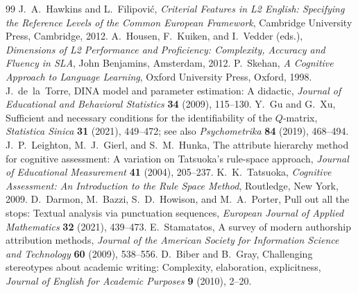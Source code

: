 \documentclass[11pt,reqno]{article}
\begin{document}
\begin{thebibliography}{99}
 J.~A.~Hawkins and L.~Filipovi\'c, \emph{Criterial Features in L2 English: Specifying the Reference Levels of the Common European Framework}, Cambridge University Press, Cambridge, 2012.
 A.~Housen, F.~Kuiken, and I.~Vedder (eds.), \emph{Dimensions of L2 Performance and Proficiency: Complexity, Accuracy and Fluency in SLA}, John Benjamins, Amsterdam, 2012.
 P.~Skehan, \emph{A Cognitive Approach to Language Learning}, Oxford University Press, Oxford, 1998.
 J.~de~la~Torre, DINA model and parameter estimation: A didactic, \emph{Journal of Educational and Behavioral Statistics} \textbf{34} (2009), 115--130.
 Y.~Gu and G.~Xu, Sufficient and necessary conditions for the identifiability of the $Q$-matrix, \emph{Statistica Sinica} \textbf{31} (2021), 449--472; see also \emph{Psychometrika} \textbf{84} (2019), 468--494.
 J.~P.~Leighton, M.~J.~Gierl, and S.~M.~Hunka, The attribute hierarchy method for cognitive assessment: A variation on Tatsuoka's rule-space approach, \emph{Journal of Educational Measurement} \textbf{41} (2004), 205--237.
 K.~K.~Tatsuoka, \emph{Cognitive Assessment: An Introduction to the Rule Space Method}, Routledge, New York, 2009.
 D.~Darmon, M.~Bazzi, S.~D.~Howison, and M.~A.~Porter, Pull out all the stops: Textual analysis via punctuation sequences, \emph{European Journal of Applied Mathematics} \textbf{32} (2021), 439--473.
 E.~Stamatatos, A survey of modern authorship attribution methods, \emph{Journal of the American Society for Information Science and Technology} \textbf{60} (2009), 538--556.
 D.~Biber and B.~Gray, Challenging stereotypes about academic writing: Complexity, elaboration, explicitness, \emph{Journal of English for Academic Purposes} \textbf{9} (2010), 2--20.
\end{thebibliography}
\end{document}
